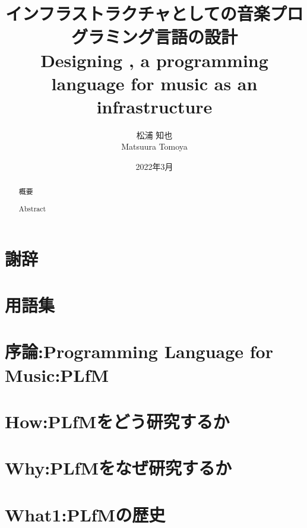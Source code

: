 \documentclass[dvipdfmx,a4paper,openany]{jsbook}
\title{インフラストラクチャとしての音楽プログラミング言語\mimium{}の設計\\
Designing \mimium{}, a programming language for music as an infrastructure
}
\author{松浦 知也 \\
        Matsuura Tomoya}
\date{2022年3月}
\begin{document}
\maketitle

\begin{abstract}
\chapter*{概要}
    
\chapter*{Abstract}
    
\end{abstract}

\chapter*{謝辞}


\setcounter{tocdepth}{3}
\tableofcontents

\chapter*{用語集}


\listoffigures
\renewcommand\lstlistlistingname{コード例目次}
\lstlistoflistings

\chapter{序論:Programming Language for Music:PLfM}


\chapter{How:PLfMをどう研究するか}


\chapter{Why:PLfMをなぜ研究するか}


\chapter{What1:PLfMの歴史}

\end{document}
